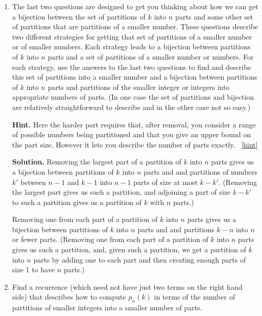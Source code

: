 \documentclass{book}
\begin{document}
\begin{activity}[]
\begin{enumerate}[font=\bfseries,label=(\alph*),ref=\alph*]
\item\label{task-221} \hypertarget{p-1165}{}%
The last two questions are designed to get you thinking about how we can get a bijection between the set of partitions of \(k\) into \(n\) parts and some other set of partitions that are partitions of a smaller number.  These questions describe two different strategies for getting that set of partitions of a smaller number or of smaller numbers.  Each strategy leads to a bijection between partitions of \(k\) into \(n\) parts and a set of partitions of a smaller number or numbers.  For each strategy, use the answers to the last two questions to find and describe this set of partitions into a smaller number and a bijection between partitions of \(k\) into \(n\) parts and partitions of the smaller integer or integers into appropriate numbers of parts. (In one case the set of partitions and bijection are relatively straightforward to describe and in the other case not so easy.)%
\par\smallskip%
\noindent\textbf{Hint.}\hypertarget{hint-136}{}\quad%
\hypertarget{p-1166}{}%
Here the harder part requires that, after removal, you consider a range of possible numbers being partitioned and that you give an upper bound on the part size. However it lets you describe the number of parts exactly.%
~\hfill{\tiny\hyperlink{a-215.c}{[hint]}\hypertarget{q-215.c}{}}\par\smallskip%
\noindent\textbf{Solution.}\hypertarget{solution-107}{}\quad%
\hypertarget{p-1167}{}%
Removing the largest part of a partition of \(k\) into \(n\) parts gives us a bijection between partitions of \(k\) into \(n\) parts and and partitions of numbers \(k'\) between \(n-1\) and \(k-1\) into \(n-1\) parts of size at most \(k-k'\). (Removing the largest part gives us such a partition, and adjoining a part of size \(k-k'\) to such a partition gives us a partition of \(k\) with \(n\) parts.)%
\par
\hypertarget{p-1168}{}%
Removing one from each part of a partition of \(k\) into \(n\) parts gives us a bijection between partitions of \(k\) into \(n\) parts and and partitions \(k-n\) into \(n\) or fewer parts. (Removing one from each part of a partition of \(k\) into \(n\) parts gives us such a partition, and, given such a partition, we get a partition of \(k\) into \(n\) parts by adding one to each part and then creating enough parts of size 1 to have \(n\) parts.)%
\item\label{task-222} \hypertarget{p-1169}{}%
Find a recurrence (which need not have just two terms on the right hand side) that describes how to compute \(p_n(k)\) in terms of the number of partitions of smaller integers into a smaller number of parts.%

\end{enumerate}
\end{activity}
\end{document}

